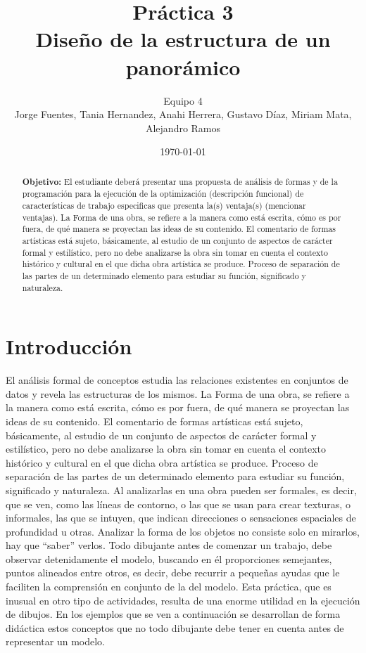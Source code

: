 \documentclass{article}
\author{Equipo 4 \\Jorge  Fuentes, Tania  Hernandez,
 Anahi Herrera, Gustavo  Díaz, Miriam  Mata, Alejandro Ramos} %
\title{Práctica 3 \\ Diseño de la estructura de un panorámico} %
\date{\today}
\begin{document}
\maketitle %
\begin{abstract} %
\textbf{Objetivo:} El estudiante deberá presentar una propuesta de análisis de formas y de la programación para la ejecución de la optimización (descripción funcional) de características de trabajo especificas que presenta la(s) ventaja(s) (mencionar ventajas). La Forma de una obra, se refiere a la manera como está escrita, cómo es por fuera, de qué manera se proyectan las ideas de su contenido. El comentario de formas artísticas está sujeto, básicamente, al estudio de un conjunto de aspectos de carácter formal y estilístico, pero no debe analizarse la obra sin tomar en cuenta el contexto histórico y cultural en el que dicha obra artística se produce. Proceso de separación de las partes de un determinado elemento para estudiar su función, significado y naturaleza.\\
\end{abstract}
\newpage
\tableofcontents
\newpage
\section{Introducción}\label{intro} %
El análisis formal de conceptos estudia las relaciones existentes en conjuntos de datos y revela las estructuras de los mismos. La Forma de una obra, se refiere a la manera como está escrita, cómo es por fuera, de qué manera se proyectan las ideas de su contenido. El comentario de formas artísticas está sujeto, básicamente, al estudio de un conjunto de aspectos de carácter formal y estilístico, pero no debe analizarse la obra sin tomar en cuenta el contexto histórico y cultural en el que dicha obra artística se produce. Proceso de separación de las partes de un determinado elemento para estudiar su función, significado y naturaleza\cite{rf1}. Al analizarlas en una obra pueden ser formales, es decir, que se ven, como las líneas de contorno, o las que se usan para crear texturas, o informales, las que se intuyen, que indican direcciones o sensaciones espaciales de profundidad u otras. Analizar la forma de los objetos no consiste solo en mirarlos, hay que “saber” verlos. Todo dibujante antes de comenzar un trabajo, debe observar detenidamente el modelo, buscando en él proporciones semejantes, puntos alineados entre otros, es decir, debe recurrir a pequeñas ayudas que le faciliten la comprensión en conjunto de la del modelo. Esta práctica, que es inusual en otro tipo de actividades, resulta de una enorme utilidad en la ejecución de dibujos. En los ejemplos que se ven a continuación se desarrollan de forma didáctica estos conceptos que no todo dibujante debe tener en cuenta antes de representar un modelo.
\end{document}
